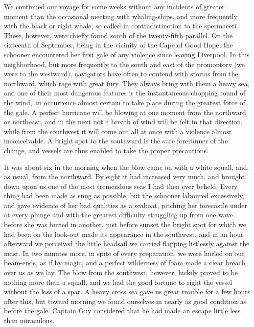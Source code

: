 We continued our voyage for some weeks without any incidents of greater
moment than the occasional meeting with whaling-ships, and more frequently with
the black or right whale, so called in contradistinction to the spermaceti.
These, however, were chiefly found south of the twenty-fifth parallel. On the
sixteenth of September, being in the vicinity of the Cape of Good Hope, the
schooner encountered her first gale of any violence since leaving Liverpool. In
this neighborhood, but more frequently to the south and east of the promontory
(we were to the westward), navigators have often to contend with storms from the
northward, which rage with great fury. They always bring with them a heavy sea,
and one of their most dangerous features is the instantaneous chopping round of
the wind, an occurrence almost certain to take place during the greatest force
of the gale. A perfect hurricane will be blowing at one moment from the
northward or northeast, and in the next not a breath of wind will be felt in
that direction, while from the southwest it will come out all at once with a
violence almost inconceivable. A bright spot to the southward is the sure
forerunner of the change, and vessels are thus enabled to take the proper
precautions. 

It was about six in the morning when the blow came on with a white squall,
and, as usual, from the northward. By eight it had increased very much, and
brought down upon us one of the most tremendous seas I had then ever beheld.
Every thing had been made as snug as possible, but the schooner laboured
excessively, and gave evidence of her bad qualities as a seaboat, pitching her
forecastle under at every plunge and with the greatest difficulty struggling up
from one wave before she was buried in another. just before sunset the bright
spot for which we had been on the look-out made its appearance in the southwest,
and in an hour afterward we perceived the little headsail we carried flapping
listlessly against the mast. In two minutes more, in spite of every preparation,
we were hurled on our beam-ends, as if by magic, and a perfect wilderness of
foam made a clear breach over us as we lay. The blow from the southwest,
however, luckily proved to be nothing more than a squall, and we had the good
fortune to right the vessel without the loss of a spar. A heavy cross sea gave
us great trouble for a few hours after this, but toward morning we found
ourselves in nearly as good condition as before the gale. Captain Guy considered
that he had made an escape little less than miraculous. 

